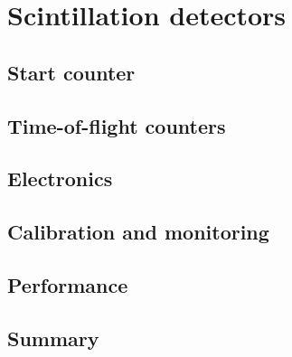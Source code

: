 \section{Scintillation detectors \label{sec:scintillators}}
\subsection{Start counter \label{sec:st}}
\subsection{Time-of-flight counters \label{sec:tof}}
\subsection{Electronics \label{sec:scelectronics}}
\subsection{Calibration and monitoring \label{sec:sccalib}}
\subsection{Performance \label{sec:scperformance}}
\subsection{Summary \label{sec:scsummary}}
